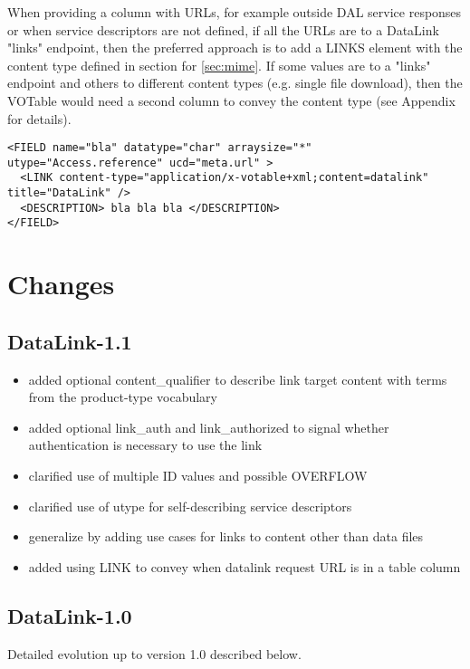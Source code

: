 \documentclass[11pt,a4paper]{ivoa}
\begin{document}
When providing a column with URLs, for example outside DAL service responses or when service descriptors  are not defined, if all the URLs are to a DataLink "links" endpoint, then the preferred approach is to add a LINKS element with the content type defined in section for \ref{sec:mime}. If some values are to a "links" endpoint and others to different content types (e.g. single file download), then the VOTable would need a second column to convey the content type (see Appendix for details). 

\begin{verbatim} 
<FIELD name="bla" datatype="char" arraysize="*" utype="Access.reference" ucd="meta.url" > 
  <LINK content-type="application/x-votable+xml;content=datalink" title="DataLink" /> 
  <DESCRIPTION> bla bla bla </DESCRIPTION> 
</FIELD>
\end{verbatim}


\section{Changes}

\subsection{DataLink-1.1}

\begin{itemize}
\item added optional content\_qualifier to describe link target content with terms from 
the product-type vocabulary
\item added optional link\_auth and link\_authorized to signal whether authentication
is necessary to use the link
\item clarified use of multiple ID values and possible OVERFLOW
\item clarified use of utype for self-describing service descriptors
\item generalize by adding use cases for links to content other than data files 
\item added using LINK to convey when datalink request URL is in a table column
\end{itemize}

\subsection{DataLink-1.0}

Detailed evolution up to version 1.0 described below.
\end{document}
